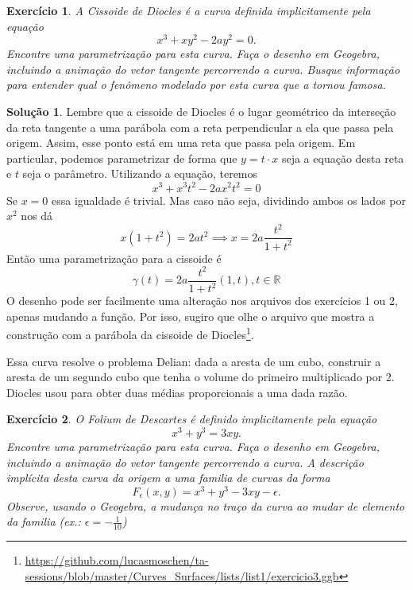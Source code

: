 \documentclass[a4paper,12pt]{article}
\theoremstyle{exer}
\newtheorem{exercise}{Exercício}
\theoremstyle{definition}
\newtheorem{solution}{Solução}
\theoremstyle{plain}
\begin{document}
\begin{exercise}
    A {\it Cissoide de Diocles} é a curva definida implicitamente pela equação
    $$x^3 + xy^2 - 2ay^2 
    = 0.$$
    Encontre uma parametrização para esta curva. Faça o desenho em Geogebra,
    incluindo a animação do vetor tangente percorrendo a curva. Busque
    informação para entender qual o fenômeno modelado por esta curva que a
    tornou famosa.
\end{exercise}

\begin{solution}
    Lembre que a cissoide de Diocles é o lugar geométrico da interseção da
    reta tangente a uma parábola com a reta perpendicular a ela que passa pela
    origem. Assim, esse ponto está em uma reta que passa pela origem. Em
    particular, podemos parametrizar de forma que $y = t\cdot x$ seja a
    equação desta reta e $t$ seja o parâmetro. Utilizando a equação, teremos 
    $$
    x^3 + x^3t^2 - 2ax^2t^2 = 0
    $$
    Se $x = 0$ essa igualdade é trivial. Mas caso não seja, dividindo ambos os
    lados por $x^2$ nos dá 
    $$
    x(1 + t^2) = 2at^2 \implies x = 2a\frac{t^2}{1 + t^2}
    $$
    Então uma parametrização para a cissoide é 
    $$
    \gamma(t) = 2a\frac{t^2}{1 + t^2}(1,t), t \in \mathbb{R}
    $$
    O desenho pode ser facilmente uma alteração nos arquivos dos exercícios 1
    ou 2, apenas mudando a função. Por isso, sugiro que olhe o arquivo que
    mostra a construção com a parábola da cissoide de
    Diocles\footnote{\url{https://github.com/lucasmoschen/ta-sessions/blob/master/Curves_Surfaces/lists/list1/exercicio3.ggb}}.
    
    Essa curva resolve o problema Delian: dada a aresta de um cubo, construir
    a aresta de um segundo cubo que tenha o volume do primeiro multiplicado
    por 2. Diocles usou para obter duas médias proporcionais a uma dada razão.
    
\end{solution}

\begin{exercise}
    O {\it Folium de Descartes} é definido implicitamente pela equação
    $$x^3 + y^3 = 3xy.$$ 
    Encontre uma parametrização para esta curva. Faça o desenho em Geogebra,
    incluindo a animação do vetor tangente percorrendo a curva. A descrição
    implícita desta curva da origem a uma familia de curvas da forma 
    $$F_{\epsilon}(x, y) = x^3 + y^3 - 3xy - \epsilon.$$
    Observe, usando o Geogebra, a mudança no traço da curva ao mudar de
    elemento da familia (ex.: $\epsilon = -\frac{1}{10}$)
\end{exercise}
\end{document}
